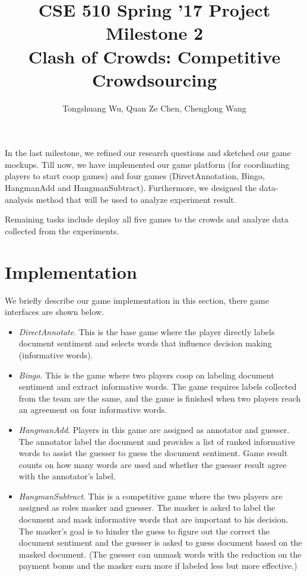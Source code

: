 \documentclass{article}
\title{{\large{CSE 510 Spring '17 Project Milestone 2}}
\\ \textbf{Clash of Crowds: Competitive Crowdsourcing}}
\author{Tongshuang Wu, Quan Ze Chen, Chenglong Wang}
\date{}
\begin{document}
\maketitle


In the last milestone, we refined our research questions and sketched our game mockups. Till now, we have implemented our game platform (for coordinating players to start coop games) and four games (DirectAnnotation, Bingo, HangmanAdd and HangmanSubtract). Furthermore, we designed the data-analysis method that will be used to analyze experiment result.

Remaining tasks include deploy all five games to the crowds and analyze data collected from the experiments.

\section{Implementation}

We briefly describe our game implementation in this section, there game interfaces are shown below.

\begin{itemize}
\item \emph{DirectAnnotate}. This is the base game where the player directly labels document sentiment and selects words that influence decision making (informative words).
\item \emph{Bingo}. This is the game where two players coop on labeling document sentiment and extract informative words. The game requires labels collected from the team are the same, and the game is finished when two players reach an agreement on four informative words. 
\item \emph{HangmanAdd}. Players in this game are assigned as annotator and guesser. The annotator label the document and provides a list of ranked informative words to assist the guesser to guess the document sentiment. Game result counts on how many words are used and whether the guesser result agree with the annotator's label.
\item \emph{HangmanSubtract}. This is a competitive game where the two players are assigned as roles masker and guesser. The masker is asked to label the document and mask informative words that are important to his decision. The masker's goal is to hinder the guess to figure out the correct the document sentiment and the guesser is asked to guess document based on the masked document. (The guesser can unmask words with the reduction on the payment bonus and the masker earn more if labeled less but more effective.) 
\end{itemize}
\end{document}
